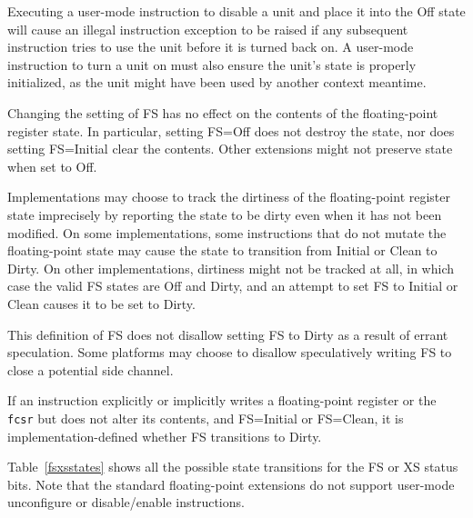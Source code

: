 Executing a user-mode instruction to disable a unit and place it into
the Off state will cause an illegal instruction exception to be raised
if any subsequent instruction tries to use the unit before it is
turned back on.  A user-mode instruction to turn a unit on must also
ensure the unit's state is properly initialized, as the unit might
have been used by another context meantime.

Changing the setting of FS has no effect on the contents of the floating-point
register state.  In particular, setting FS=Off does not destroy the state, nor
does setting FS=Initial clear the contents.  Other extensions might not
preserve state when set to Off.

Implementations may choose to track the dirtiness of the floating-point
register state imprecisely by reporting the state to be dirty even when
it has not been modified.  On some implementations, some instructions that
do not mutate the floating-point state may cause the state to transition from
Initial or Clean to Dirty.  On other implementations, dirtiness might not be
tracked at all, in which case the valid FS states are Off and Dirty, and an
attempt to set FS to Initial or Clean causes it to be set to Dirty.
\begin{commentary}
This definition of FS does not disallow setting FS to Dirty as a result of
errant speculation.  Some platforms may choose to disallow speculatively
writing FS to close a potential side channel.
\end{commentary}

If an instruction explicitly or implicitly writes a floating-point register or
the {\tt fcsr} but does not alter its contents, and FS=Initial or FS=Clean, it
is implementation-defined whether FS transitions to Dirty.

Table~\ref{fsxsstates} shows all the possible state transitions for
the FS or XS status bits.  Note that the standard floating-point
extensions do not support user-mode unconfigure or disable/enable
instructions.

